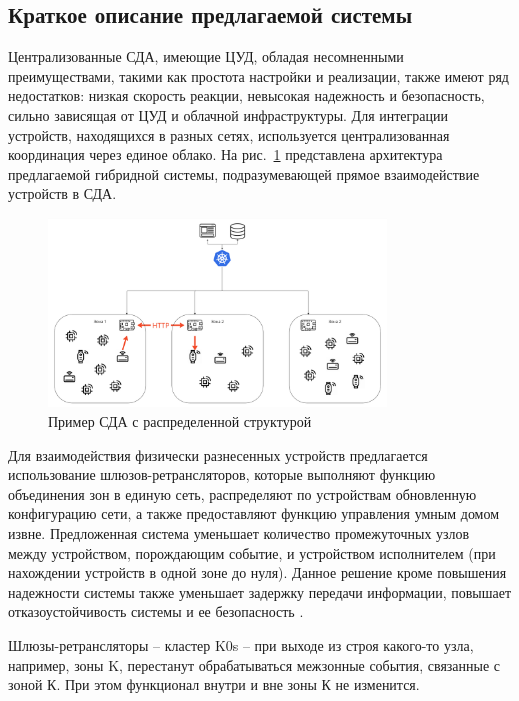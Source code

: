 \documentclass[a4paper,12pt]{article}
\begin{document}
\subsection{Краткое описание предлагаемой системы}
Централизованные СДА, имеющие ЦУД, обладая несомненными преимуществами, такими как простота настройки и реализации,
также имеют ряд недостатков: низкая скорость реакции, невысокая надежность и безопасность, сильно зависящая от ЦУД
и облачной инфраструктуры. Для интеграции устройств, находящихся в разных сетях, используется централизованная
координация через единое облако. На рис.~\ref{fig:distributed_home_example} представлена архитектура предлагаемой гибридной системы, подразумевающей
прямое взаимодействие устройств в СДА.


\begin{figure}[h]
    \centering
    \includegraphics[width=0.8\textwidth]{images/Fig04.png}
    \caption{Пример СДА с распределенной структурой}
    \label{fig:distributed_home_example}
\end{figure}

Для взаимодействия физически разнесенных устройств предлагается использование
шлюзов-ретрансляторов, которые выполняют функцию объединения зон в единую сеть,
распределяют по устройствам обновленную конфигурацию сети, а также предоставляют функцию управления умным домом извне.
Предложенная система уменьшает количество промежуточных узлов между устройством, порождающим событие, и устройством
исполнителем (при нахождении устройств в одной зоне до нуля). Данное решение кроме повышения надежности системы также
уменьшает задержку передачи информации, повышает отказоустойчивость системы и ее безопасность \cite{SecuritySmartHome, SecuritySmartHome2}.


Шлюзы-ретрансляторы -- кластер K0s -- при выходе из строя какого-то узла, например, зоны
K, перестанут обрабатываться межзонные события, связанные с зоной К. При этом функционал внутри и вне зоны
К не изменится.
\end{document}
